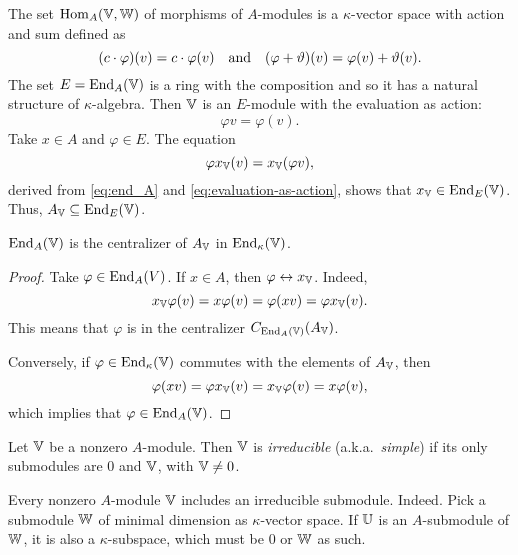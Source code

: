 \begin{rem}\label{rem:E_A(V)}
    The set ${\rm Hom}_A(\mathbb V,\mathbb W)$ of morphisms of $A$-modules is a $\kappa$-vector space with action and sum defined as
    $$
        (c\cdot\varphi)(v) = c\cdot\varphi(v)
        \quad\text{\rm and}\quad
        (\varphi+\vartheta)(v)=\varphi(v)+\vartheta(v).
    $$
    The set $E={\operatorname{End}}_A(\mathbb V)$ is a ring with the composition and so it has a natural structure of $\kappa$-algebra. Then $\mathbb V$ is an $E$-module with the evaluation as action:
    \begin{equation}\label{eq:evaluation-as-action}
        \varphi v=\varphi(v).
    \end{equation}
    Take $x\in A$ and $\varphi\in E$. The equation
    $$
        \varphi x_\mathbb V(v)=x_\mathbb V(\varphi v),
    $$
    derived from \eqref{eq:end_A} and \eqref{eq:evaluation-as-action}, shows that $x_\mathbb V\in {\operatorname{End}}_E(\mathbb V)$. Thus, $A_\mathbb V\subseteq {\operatorname{End}}_E(\mathbb V)$.
\end{rem}

\begin{prop}\label{prop:homotecy-centralizer}
    ${\operatorname{End}}_A(\mathbb V)$ is the centralizer of\/ $A_\mathbb V$ in\/ ${\operatorname{End}}_\kappa(\mathbb V)$.
\end{prop}

\begin{proof}
    Take $\varphi\in {\operatorname{End}}_A(V)$. If $x\in A$, then $\varphi\leftrightarrow x_\mathbb V$. Indeed,
    \begin{equation}\label{eq:phi-commutativity}
        x_\mathbb V\varphi(v)=x\varphi(v)=\varphi(xv)
            =\varphi x_\mathbb V(v).
    \end{equation}
    This means that $\varphi$ is in the centralizer $C_{{\operatorname{End}}_A(\mathbb V)}(A_\mathbb V)$.

    Conversely, if $\varphi\in{\operatorname{End}}_\kappa(\mathbb V)$ commutes with the elements of $A_\mathbb V$, then
    $$
        \varphi(xv)=\varphi x_\mathbb V(v)=x_\mathbb V\varphi(v)=x\varphi(v),
    $$
    which implies that $\varphi\in {\operatorname{End}}_A(\mathbb V)$.
\end{proof}

\begin{defn}
    Let $\mathbb V$ be a nonzero $A$-module. Then $\mathbb V$ is \textsl{irreducible} (a.k.a.~\textsl{simple}) if its only submodules are $0$ and $\mathbb V$, with $\mathbb V\ne0$.
\end{defn}

\begin{rem}\label{rem:irreducible-exists}
    Every nonzero $A$-module $\mathbb V$ includes an irreducible submodule. Indeed. Pick a submodule $\mathbb W$ of minimal dimension as $\kappa$-vector space. If $\mathbb U$ is an $A$-submodule of $\mathbb W$, it is also a $\kappa$-subspace, which must be $0$ or $\mathbb W$ as such.
\end{rem}

